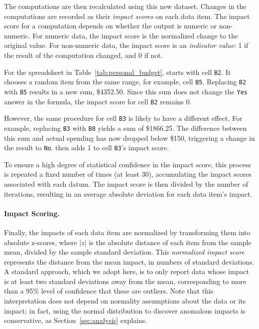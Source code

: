The computations are then recalculated using this new dataset. Changes
in the computations are recorded as their \emph{impact scores} on each
data item.  The impact score for a computation depends on whether the
output is numeric or non-numeric. For numeric data, the impact score
is the normalized change to the original value.
For non-numeric data, the impact score is an \emph{indicator value}: 1
if the result of the computation changed, and 0 if not.

For the spreadsheet in Table~\ref{tab:personal_budget}, \checkcell{}
starts with cell \texttt{B2}. It chooses a random item from the same
range, for example, cell \texttt{B5}. Replacing \texttt{B2}
with \texttt{B5} results in a new sum, \$4352.50. Since this sum does
not change the \texttt{Yes} answer in the formula, the impact score
for cell \texttt{B2} remains 0.

However, the same procedure for cell \texttt{B3} is likely to have a
different effect.  For example, replacing \texttt{B3}
with \texttt{B8} yields a sum of \$1866.25. The difference
between this sum and actual spending has now dropped below \$150,
triggering a change in the result to \texttt{No}. \checkcell{} then
adds 1 to cell \texttt{B3}'s impact score.


To ensure a high degree of statistical confidence in the impact score,
this process is repeated a fixed number of times (at least 30),
accumulating the impact scores associated with each datum. The impact
score is then divided by the number of iterations, resulting in an
average absolute deviation for each data item's impact.

\paragraph{Impact Scoring.}
Finally, the impacts of each data item are normalized by transforming
them into absolute z-scores, where $|z|$ is the absolute distance of
each item from the sample mean, divided by the sample standard
deviation. This \emph{normalized impact score} represents the distance
from the mean impact, in numbers of standard deviations. A standard
approach, which we adopt here, is to only report data whose impact is
at least two standard deviations away from the mean, corresponding to
more than a 95\% level of confidence that these are outliers.  Note
that this interpretation does not depend on normality assumptions
about the data or its impact; in fact, using the normal distribution
to discover anomalous impacts is conservative, as
Section~\ref{sec:analysis} explains.

